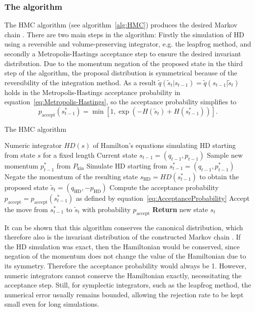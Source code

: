 \subsubsection{The algorithm}
The HMC algorithm (see algorithm~\ref{alg:HMC}) produces the desired Markov chain \parencite{Neal2011}. There are two main steps in the algorithm: Firstly the simulation of HD using a reversible and volume-preserving integrator, e.g. the leapfrog method, and secondly a Metropolis-Hastings acceptance step to ensure the desired invariant distribution. Due to the momentum negation of the proposed state in the third step of the algorithm, the proposal distribution is symmetrical because of the reversibility of the integration method. As a result $\tilde{q}(\tilde{s}_t|s_{t-1}) = \tilde{q}(s_{t-1}|\tilde{s}_t)$ holds in the Metropolis-Hastings acceptance probability in equation~\eqref{eq:Metropolis-Hastings}, so the acceptance probability simplifies to
\begin{equation} \label{eq:AcceptanceProbability}
p_{\textrm{accept}}(s^*_{t-1}) = \min[1, \exp(-H(\tilde{s}_t) + H(s^*_{t-1}))].
\end{equation}

\begin{algorithm}
\caption{The HMC algorithm}\label{alg:HMC}
\begin{algorithmic}[1]
\Require Numeric integrator $HD(s)$ of Hamilton's equations simulating HD starting from state $s$ for a fixed length
\Require Current state $s_{t-1} = (q_{t-1}, p_{t-1})$
\State Sample new momentum $p^*_{t-1}$ from $P_\textrm{kin}$
\State Simulate HD starting from $s^*_{t-1} = (q_{t-1}, p^*_{t-1})$
\State Negate the momentum of the resulting state $s_\textrm{HD} = HD(s^*_{t-1})$ to obtain the proposed state $\tilde{s}_t = (q_\textrm{HD}, - p_\textrm{HD})$
\State Compute the acceptance probability $p_\textrm{accept}=p_\textrm{accept}(s^*_{t-1})$ as defined by equation~\eqref{eq:AcceptanceProbability}
\State Accept the move from $s^*_{t-1}$ to $\tilde{s}_t$ with probability $p_\textrm{accept}$
\State \textbf{Return} new state $s_t$
\end{algorithmic}
\end{algorithm}

It can be shown that this algorithm conserves the canonical distribution, which therefore also is the invariant distribution of the constructed Markov chain \parencite{Neal2011}. If the HD simulation was exact, then the Hamiltonian would be conserved, since negation of the momentum does not change the value of the Hamiltonian due to its symmetry. Therefore the acceptance probability would always be 1. However, numeric integrators cannot conserve the Hamiltonian exactly, necessitating the acceptance step. Still, for symplectic integrators, such as the leapfrog method, the numerical error usually remains bounded, allowing the rejection rate to be kept small even for long simulations.


